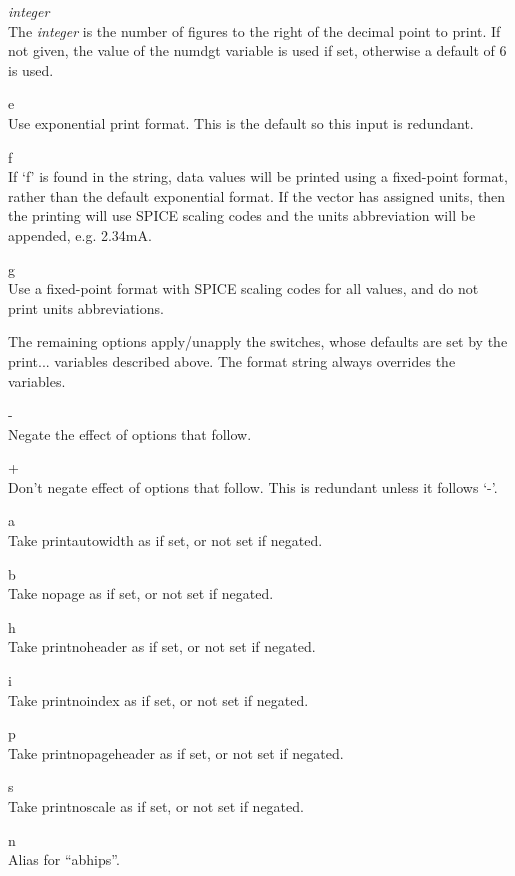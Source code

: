 \begin{description}
\item{\it integer}\\
The {\it integer} is the number of figures to the right of the decimal
point to print.  If not given, the value of the {\et numdgt} variable
is used if set, otherwise a default of 6 is used.

\item{\vt e}\\
Use exponential print format.  This is the default so this input is
redundant.

\item{\vt f}\\
If `{\vt f}' is found in the string, data values will be printed using
a fixed-point format, rather than the default exponential format.  If
the vector has assigned units, then the printing will use SPICE
scaling codes and the units abbreviation will be appended, e.g.
2.34mA.

\item{\vt g}\\
Use a fixed-point format with SPICE scaling codes for all values, and
do not print units abbreviations.
\end{description}

The remaining options apply/unapply the switches, whose defaults are
set by the {\et print...} variables described above.  The format
string always overrides the variables.

\begin{description}
\item{\vt -}\\
Negate the effect of options that follow.
\item{\vt +}\\
Don't negate effect of options that follow.  This is redundant
unless it follows `{\vt -}'.
\item{\vt a}\\
Take {\et printautowidth} as if set, or not set if negated.
\item{\vt b}\\
Take {\et nopage} as if set, or not set if negated.
\item{\vt h}\\
Take {\et printnoheader} as if set, or not set if negated.
\item{\vt i}\\
Take {\et printnoindex} as if set, or not set if negated.
\item{\vt p}\\
Take {\et printnopageheader} as if set, or not set if negated.
\item{\vt s}\\
Take {\et printnoscale} as if set, or not set if negated.
\item{\vt n}\\
Alias for ``{\vt abhips}''.
\end{description}

